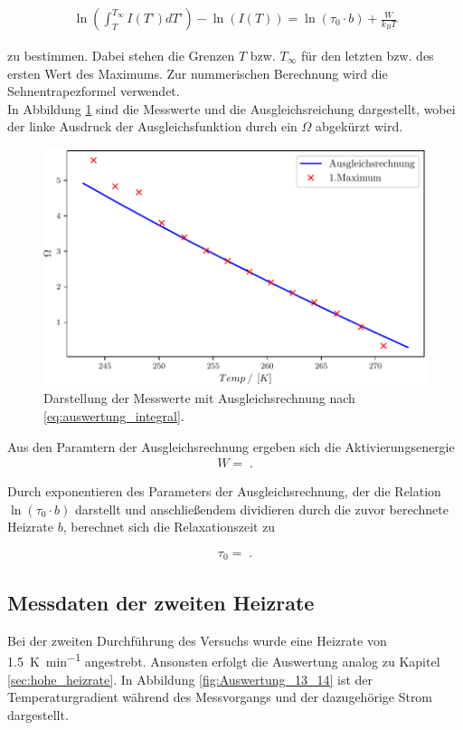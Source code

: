 \begin{align}
	\ln(\int_{T}^{T_{\infty}} I(T’) dT’) - \ln(I(T))=\ln(\tau_0\cdot b) + \frac{W}{k_B T}
	\label{eq:auswertung_integral}
\end{align}

zu bestimmen. Dabei stehen die Grenzen $T$ bzw. $T_{\infty}$ für den letzten bzw. des ersten Wert des Maximums. Zur nummerischen Berechnung wird die Sehnentrapezformel verwendet. \\
In Abbildung \ref{fig:Auswertung_9_10} sind die Messwerte und die Ausgleichsreichung dargestellt, wobei der linke Ausdruck der Ausgleichsfunktion durch ein $\Omega$ abgekürzt wird.

\begin{figure}[H]
  \centering
  \includegraphics[width=.75\textwidth]{build/1_Temp_current_peak_log_3.pdf}
  \caption{Darstellung der Messwerte mit Ausgleichsrechnung nach \ref{eq:auswertung_integral}.}
  \label{fig:Auswertung_9_10}
\end{figure}

Aus den Paramtern der Ausgleichsrechnung ergeben sich die Aktivierungsenergie 
\begin{align}
	W = \;.
\end{align}

Durch exponentieren des Parameters der Ausgleichsrechnung, der die Relation $\ln(\tau_0\cdot b)$ darstellt und anschließendem dividieren durch die zuvor berechnete Heizrate $b$, berechnet sich die Relaxationszeit zu

\begin{align}
	\tau_{0} = \;.
\end{align}


\subsection{Messdaten der zweiten Heizrate}
Bei der zweiten Durchführung des Versuchs wurde eine Heizrate von \SI{1.5}{\kelvin\per\minute} angestrebt. Ansonsten erfolgt die Auswertung analog zu Kapitel \ref{sec:hohe_heizrate}.
In Abbildung \ref{fig:Auswertung_13_14} ist der Temperaturgradient während des Messvorgangs und der dazugehörige Strom dargestellt. 

